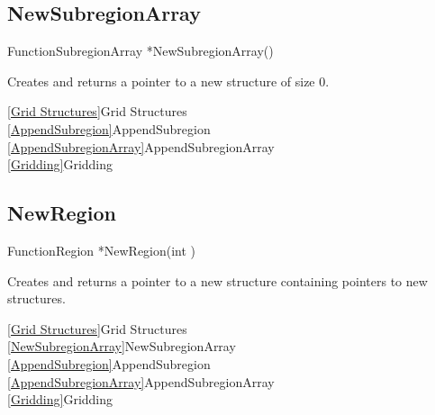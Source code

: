 \newpage
\subsection{NewSubregionArray}
\label{NewSubregionArray}


\begin{deftypefn}{Function}{SubregionArray *}{NewSubregionArray}()

\DESCRIPTION
Creates and returns a pointer to a new  structure
of size 0.

\SEEALSO
\vref{Grid Structures}{Grid Structures}\\
\vref{AppendSubregion}{AppendSubregion}\\
\vref{AppendSubregionArray}{AppendSubregionArray}\\
\vref{Gridding}{Gridding}

\end{deftypefn}


\newpage
\subsection{NewRegion}
\label{NewRegion}


\begin{deftypefn}{Function}{Region *}{NewRegion}(int )

\DESCRIPTION
Creates and returns a pointer to a new  structure
containing  pointers to new  structures.

\SEEALSO
\vref{Grid Structures}{Grid Structures}\\
\vref{NewSubregionArray}{NewSubregionArray}\\
\vref{AppendSubregion}{AppendSubregion}\\
\vref{AppendSubregionArray}{AppendSubregionArray}\\
\vref{Gridding}{Gridding}

\end{deftypefn}

